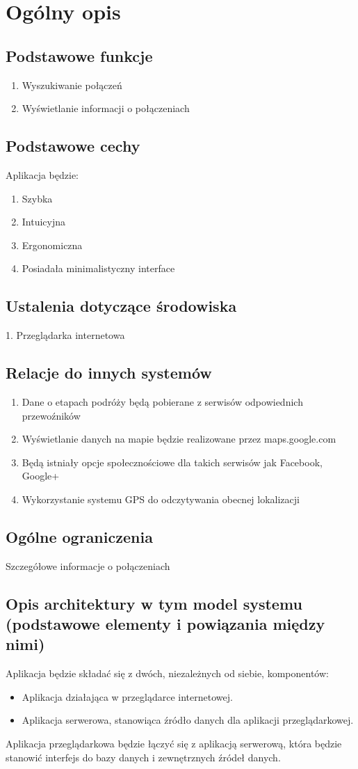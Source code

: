 \documentclass[12pt,a4paper]{report}
\begin{document}
\section{Ogólny opis}
\subsection{Podstawowe funkcje}
\begin{enumerate}
	\item  Wyszukiwanie połączeń
	\item  Wyświetlanie informacji o połączeniach
\end{enumerate}
\subsection{Podstawowe cechy}
	Aplikacja będzie:
	\begin{enumerate}
		\item Szybka
		\item Intuicyjna
		\item Ergonomiczna
		\item Posiadała minimalistyczny interface
	\end{enumerate}
\subsection{Ustalenia dotyczące środowiska}
	1. Przeglądarka internetowa
\subsection{Relacje do innych systemów}
\begin{enumerate}
	\item Dane o etapach podróży będą pobierane z serwisów odpowiednich przewoźników
	\item Wyświetlanie danych na mapie będzie realizowane przez maps.google.com
	\item Będą istniały opcje społecznościowe dla takich serwisów jak Facebook, Google+
	\item Wykorzystanie systemu GPS do odczytywania obecnej lokalizacji
\end{enumerate}
\subsection{Ogólne ograniczenia}	
 	Szczegółowe informacje o połączeniach
\subsection{Opis architektury w tym model systemu (podstawowe elementy i powiązania między nimi)}
Aplikacja będzie składać się z dwóch, niezależnych od siebie, komponentów:
\begin{itemize}
	\item Aplikacja działająca w przeglądarce internetowej.
	\item Aplikacja serwerowa, stanowiąca źródło danych dla aplikacji przeglądarkowej.
\end{itemize} 
	Aplikacja przeglądarkowa będzie łączyć się z aplikacją serwerową, która będzie stanowić interfejs do bazy danych i zewnętrznych źródeł danych.
\end{document}
